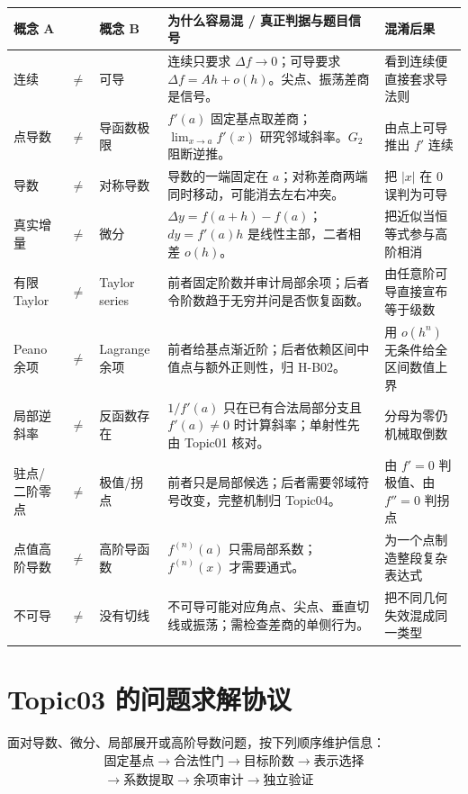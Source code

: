 \documentclass[11pt,a4paper]{ctexart}
\begin{document}
\begin{longtable}{L{1.95cm}@{}>{\centering\arraybackslash}p{0.35cm}@{}L{1.95cm}L{5.55cm}L{\dimexpr\linewidth-10.15cm\relax}}
\toprule
\textbf{概念 A} & & \textbf{概念 B} & \textbf{为什么容易混 / 真正判据与题目信号} & \textbf{混淆后果}\\
\midrule
连续 & $\neq$ & 可导 & 连续只要求 $\Delta f\to0$；可导要求 $\Delta f=Ah+o(h)$。尖点、振荡差商是信号。 & 看到连续便直接套求导法则\\
点导数 & $\neq$ & 导函数极限 & $f'(a)$ 固定基点取差商；$\lim_{x\to a}f'(x)$ 研究邻域斜率。$G_2$ 阻断逆推。 & 由点上可导推出 $f'$ 连续\\
导数 & $\neq$ & 对称导数 & 导数的一端固定在 $a$；对称差商两端同时移动，可能消去左右冲突。 & 把 $|x|$ 在 $0$ 误判为可导\\
真实增量 & $\neq$ & 微分 & $\Delta y=f(a+h)-f(a)$；$dy=f'(a)h$ 是线性主部，二者相差 $o(h)$。 & 把近似当恒等式参与高阶相消\\
有限 Taylor & $\neq$ & Taylor series & 前者固定阶数并审计局部余项；后者令阶数趋于无穷并问是否恢复函数。 & 由任意阶可导直接宣布等于级数\\
Peano 余项 & $\neq$ & Lagrange 余项 & 前者给基点渐近阶；后者依赖区间中值点与额外正则性，归 H-B02。 & 用 $o(h^n)$ 无条件给全区间数值上界\\
局部逆斜率 & $\neq$ & 反函数存在 & $1/f'(a)$ 只在已有合法局部分支且 $f'(a)\ne0$ 时计算斜率；单射性先由 Topic01 核对。 & 分母为零仍机械取倒数\\
驻点/二阶零点 & $\neq$ & 极值/拐点 & 前者只是局部候选；后者需要邻域符号改变，完整机制归 Topic04。 & 由 $f'=0$ 判极值、由 $f''=0$ 判拐点\\
点值高阶导数 & $\neq$ & 高阶导函数 & $f^{(n)}(a)$ 只需局部系数；$f^{(n)}(x)$ 才需要通式。 & 为一个点制造整段复杂表达式\\
不可导 & $\neq$ & 没有切线 & 不可导可能对应角点、尖点、垂直切线或振荡；需检查差商的单侧行为。 & 把不同几何失效混成同一类型\\
\bottomrule
\end{longtable}

\section{Topic03 的问题求解协议}

面对导数、微分、局部展开或高阶导数问题，按下列顺序维护信息：
\[
\boxed{
\begin{gathered}
\text{固定基点}\to\text{合法性门}\to\text{目标阶数}\to\text{表示选择}\\
\to\text{系数提取}\to\text{余项审计}\to\text{独立验证}
\end{gathered}}
\]
\end{document}
